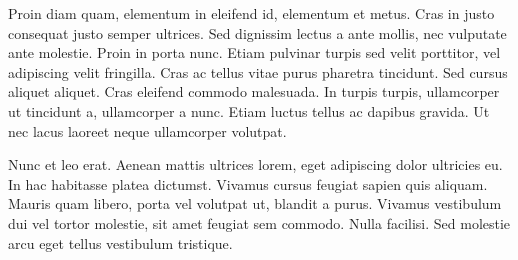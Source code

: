 Proin diam quam, elementum in eleifend id, elementum et metus. Cras in justo consequat justo semper ultrices. Sed dignissim lectus a ante mollis, nec vulputate ante molestie. Proin in porta nunc. Etiam pulvinar turpis sed velit porttitor, vel adipiscing velit fringilla. Cras ac tellus vitae purus pharetra tincidunt. Sed cursus aliquet aliquet. Cras eleifend commodo malesuada. In turpis turpis, ullamcorper ut tincidunt a, ullamcorper a nunc. Etiam luctus tellus ac dapibus gravida. Ut nec lacus laoreet neque ullamcorper volutpat.

Nunc et leo erat. Aenean mattis ultrices lorem, eget adipiscing dolor ultricies eu. In hac habitasse platea dictumst. Vivamus cursus feugiat sapien quis aliquam. Mauris quam libero, porta vel volutpat ut, blandit a purus. Vivamus vestibulum dui vel tortor molestie, sit amet feugiat sem commodo. Nulla facilisi. Sed molestie arcu eget tellus vestibulum tristique. 